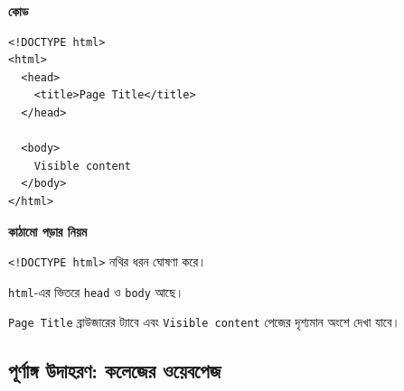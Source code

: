 \par\noindent
\begin{minipage}[t]{.50\linewidth}\vspace{0pt}\small
\textbf{\color{chFourTeal}কোড}\par
\begin{verbatim}
<!DOCTYPE html>
<html>
  <head>
    <title>Page Title</title>
  </head>

  <body>
    Visible content
  </body>
</html>
\end{verbatim}

\par\smallskip
\end{minipage}\hfill
\begin{minipage}[t]{.46\linewidth}\vspace{0pt}\small
\textbf{\color{chFourTeal}কাঠামো পড়ার নিয়ম}\par
\texttt{<!DOCTYPE html>} নথির ধরন ঘোষণা করে।\par
\texttt{html}-এর ভিতরে \texttt{head} ও \texttt{body} আছে।\par
\texttt{Page Title} ব্রাউজারের ট্যাবে এবং \texttt{Visible content} পেজের দৃশ্যমান অংশে দেখা যাবে।
\end{minipage}\par


\subsection{পূর্ণাঙ্গ উদাহরণ: কলেজের ওয়েবপেজ}

